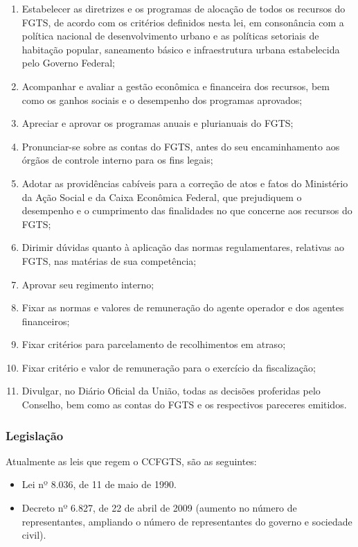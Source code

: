 \begin{enumerate}
\item 
Estabelecer as diretrizes e os programas de alocação de todos os
recursos do FGTS, de acordo com os critérios definidos nesta lei, em
consonância com a política nacional de desenvolvimento urbano e as
políticas setoriais de habitação popular, saneamento básico e
infraestrutura urbana estabelecida pelo Governo Federal;
\item 
Acompanhar e avaliar a gestão econômica e financeira dos recursos,
bem como os ganhos sociais e o desempenho dos programas aprovados;
\item 
Apreciar e aprovar os programas anuais e plurianuais do FGTS;
\item 
Pronunciar-se sobre as contas do FGTS, antes do seu encaminhamento aos
órgãos de controle interno para os fins legais;
\item 
Adotar as providências cabíveis para a correção de atos e
fatos do Ministério da Ação Social e da Caixa Econômica
Federal, que prejudiquem o desempenho e o cumprimento das finalidades
no que concerne aos recursos do FGTS;
\item 
Dirimir dúvidas quanto à aplicação das normas regulamentares,
relativas ao FGTS, nas matérias de sua competência;
\item 
Aprovar seu regimento interno;
\item 
Fixar as normas e valores de remuneração do agente operador e dos
agentes financeiros;
\item 
Fixar critérios para parcelamento de recolhimentos em atraso;
\item 
Fixar critério e valor de remuneração para o exercício da
fiscalização;
\item 
Divulgar, no Diário Oficial da União, todas as decisões proferidas
pelo Conselho, bem como as contas do FGTS e os respectivos pareceres
emitidos.
\end{enumerate}

\subsubsection*{Legislação}

Atualmente as leis que regem o CCFGTS, são as seguintes:

\begin{itemize}
\item Lei nº 8.036, de 11 de maio de 1990.
\item Decreto nº 6.827, de 22 de abril de 2009 (aumento no
número de representantes, ampliando o número de representantes do
governo e sociedade civil).
\end{itemize}

